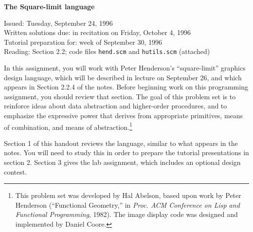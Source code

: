 
%

%



\begin{center}
{\bf The Square-limit language}
\end{center}

\begin{flushleft}
Issued: Tuesday, September 24, 1996 \\
\smallskip
Written solutions due: in recitation on Friday, October 4, 1996\\
\smallskip
Tutorial preparation for: week of September 30, 1996 \\
\smallskip
Reading: Section 2.2; code files {\tt hend.scm} and
{\tt hutils.scm} (attached)
\end{flushleft}

In this assignment, you will work with Peter Henderson's
``square-limit'' graphics design language, which will be described in
lecture on September 26, and which appears in Section 2.2.4 of the notes.  Before beginning work on this programming
assignment, you should review that section.  The goal of
this problem set is to reinforce ideas about data abstraction and
higher-order procedures, and to emphasize the expressive power that
derives from appropriate primitives, means of combination, and means
of abstraction.\footnote{This problem set was developed by Hal
Abelson, based upon work by Peter Henderson (``Functional Geometry,''
in {\em Proc. ACM Conference on Lisp and Functional Programming},
1982).  The image display code was designed and implemented by Daniel
Coore.}


Section 1 of this handout reviews the language, similar to what
appears in the notes.  You will need to study this in order to prepare the
tutorial presentations in section 2.  Section 3 gives the lab assignment,
which includes an optional design contest.

